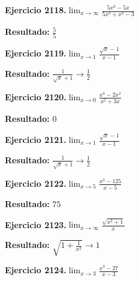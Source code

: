 \documentclass[10pt,a4paper]{article}
\begin{document}
\begin{ejbox}
\textbf{Ejercicio 2118.}\quad $\lim_{x\to \infty} \frac{5x^3 - 5x}{5x^3 + x^2 - 3}$
\end{ejbox}

\begin{solbox}
\textbf{Resultado:} \(\displaystyle \frac{5}{5}\)
\end{solbox}

\begin{ejbox}
\textbf{Ejercicio 2119.}\quad $\lim_{x\to 1} \frac{\sqrt{x}-1}{x-1}$
\end{ejbox}

\begin{solbox}
\textbf{Resultado:} \(\displaystyle \frac{1}{\sqrt{x}+1} \to \frac{1}{2}\)
\end{solbox}

\newpage
\begin{ejbox}
\textbf{Ejercicio 2120.}\quad $\lim_{x\to 0} \frac{x^3-2x^2}{x^2+3x}$
\end{ejbox}

\begin{solbox}
\textbf{Resultado:} \(\displaystyle 0\)
\end{solbox}

\begin{ejbox}
\textbf{Ejercicio 2121.}\quad $\lim_{x\to 1} \frac{\sqrt{x}-1}{x-1}$
\end{ejbox}

\begin{solbox}
\textbf{Resultado:} \(\displaystyle \frac{1}{\sqrt{x}+1} \to \frac{1}{2}\)
\end{solbox}

\begin{ejbox}
\textbf{Ejercicio 2122.}\quad $\lim_{x\to 5} \frac{x^3-125}{x-5}$
\end{ejbox}

\begin{solbox}
\textbf{Resultado:} \(\displaystyle 75\)
\end{solbox}

\newpage
\begin{ejbox}
\textbf{Ejercicio 2123.}\quad $\lim_{x\to \infty} \frac{\sqrt{x^2+1}}{x}$
\end{ejbox}

\begin{solbox}
\textbf{Resultado:} \(\displaystyle \sqrt{1+\frac{1}{x^2}} \to 1\)
\end{solbox}

\begin{ejbox}
\textbf{Ejercicio 2124.}\quad $\lim_{x\to 3} \frac{x^3-27}{x-3}$
\end{ejbox}
\end{document}
